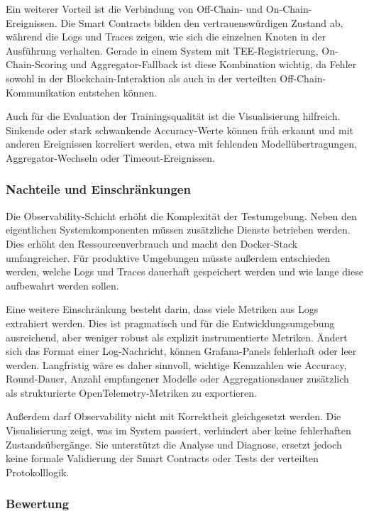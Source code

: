 Ein weiterer Vorteil ist die Verbindung von Off-Chain- und On-Chain-Ereignissen. Die Smart Contracts bilden den vertrauenswürdigen Zustand ab, während die Logs und Traces zeigen, wie sich die einzelnen Knoten in der Ausführung verhalten. Gerade in einem System mit TEE-Registrierung, On-Chain-Scoring und Aggregator-Fallback ist diese Kombination wichtig, da Fehler sowohl in der Blockchain-Interaktion als auch in der verteilten Off-Chain-Kommunikation entstehen können.

Auch für die Evaluation der Trainingsqualität ist die Visualisierung hilfreich. Sinkende oder stark schwankende Accuracy-Werte können früh erkannt und mit anderen Ereignissen korreliert werden, etwa mit fehlenden Modellübertragungen, Aggregator-Wechseln oder Timeout-Ereignissen.

\subsubsection{Nachteile und Einschränkungen}

Die Observability-Schicht erhöht die Komplexität der Testumgebung. Neben den eigentlichen Systemkomponenten müssen zusätzliche Dienste betrieben werden. Dies erhöht den Ressourcenverbrauch und macht den Docker-Stack umfangreicher. Für produktive Umgebungen müsste außerdem entschieden werden, welche Logs und Traces dauerhaft gespeichert werden und wie lange diese aufbewahrt werden sollen.

Eine weitere Einschränkung besteht darin, dass viele Metriken aus Logs extrahiert werden. Dies ist pragmatisch und für die Entwicklungsumgebung ausreichend, aber weniger robust als explizit instrumentierte Metriken. Ändert sich das Format einer Log-Nachricht, können Grafana-Panels fehlerhaft oder leer werden. Langfristig wäre es daher sinnvoll, wichtige Kennzahlen wie Accuracy, Round-Dauer, Anzahl empfangener Modelle oder Aggregationsdauer zusätzlich als strukturierte OpenTelemetry-Metriken zu exportieren.

Außerdem darf Observability nicht mit Korrektheit gleichgesetzt werden. Die Visualisierung zeigt, was im System passiert, verhindert aber keine fehlerhaften Zustandsübergänge. Sie unterstützt die Analyse und Diagnose, ersetzt jedoch keine formale Validierung der Smart Contracts oder Tests der verteilten Protokolllogik.

\subsubsection{Bewertung}


